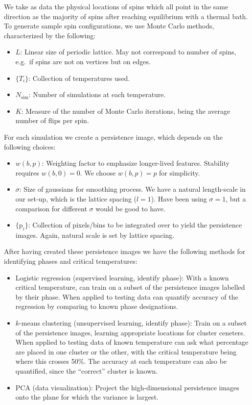 \documentclass[11pt]{article}
\begin{document}
We take as data the physical locations of spins which all point in the same direction as the majority of spins after reaching equilibrium with a thermal bath. To generate sample spin configurations, we use Monte Carlo methods, characterized by the following:
\begin{itemize}
    \item $L$: Linear size of periodic lattice. May not correspond to number of spins, e.g.~if spins are not on vertices but on edges.
    \item $\{T_i\}$: Collection of temperatures used.
    \item $N_\text{sim}$: Number of simulations at each temperature.
    \item $K$: Measure of the number of Monte Carlo iterations, being the average number of flips per spin.
\end{itemize}
For each simulation we create a persistence image, which depends on the following choices:
\begin{itemize}
    \item $w(b,p)$: Weighting factor to emphasize longer-lived features. Stability requires $w(b,0)=0$. We choose $w(b,p)=p$ for simplicity.
    \item $\sigma$: Size of gaussians for smoothing process. We have a natural length-scale in our set-up, which is the lattice spacing ($l=1$). Have been using $\sigma=1$, but a comparison for different $\sigma$ would be good to have.
    \item $\{\text{p}_i\}$: Collection of pixels/bins to be integrated over to yield the persistence images. Again, natural scale is set by lattice spacing.
\end{itemize}
After having created these persistence images we have the following methods for identifying phases and critical temperatures:
\begin{itemize}
    \item Logistic regression (supervised learning, identify phase): With a known critical temperature, can train on a subset of the persistence images labelled by their phase. When applied to testing data can quantify accuracy of the regression by comparing to known phase designations.
    \item $k$-means clustering (unsupervised learning, identify phase): Train on a subset of the persistence images, learning appropriate locations for cluster ceneters. When applied to testing data of known temperature can ask what percentage are placed in one cluster or the other, with the critical temperature being where this crosses 50\%. The accuracy at each temperature can also be quantified, since the ``correct'' cluster is known.
    \item PCA (data visualization): Project the high-dimensional persistence images onto the plane for which the variance is largest.
\end{itemize}
\end{document}

